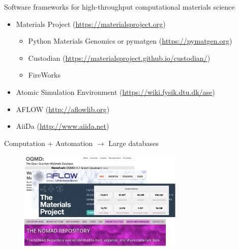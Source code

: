 \documentclass[aspectratio=169]{beamer}
\begin{document}
\begin{frame}{Software frameworks for high-throughput computational materials science}
\begin{itemize}
    \item Materials Project (\url{https://materialsproject.org})\cite{jainCommentaryMaterialsProject2013}
    \begin{itemize}
        \item Python Materials Genomics or pymatgen (\url{https://pymatgen.org})\cite{ongPythonMaterialsGenomics2013}
        \item Custodian (\url{https://materialsproject.github.io/custodian/})
        \item FireWorks \cite{jainFireWorksDynamicWorkflow2015}
    \end{itemize}
    \item Atomic Simulation Environment (\url{https://wiki.fysik.dtu.dk/ase})
    \item AFLOW (\url{http://aflowlib.org})\cite{curtaroloAFLOWLIBORGDistributed2012}
    \item AiiDa (\url{http://www.aiida.net})
\end{itemize}
\end{frame}


\begin{frame}{Computation + Automation $\rightarrow$ Large databases}
\begin{figure}
    \centering
    \includegraphics[width=0.7\textwidth]{lectures/slides_tex/materials_databases.png}
\end{figure}
\end{frame}
\end{document}
